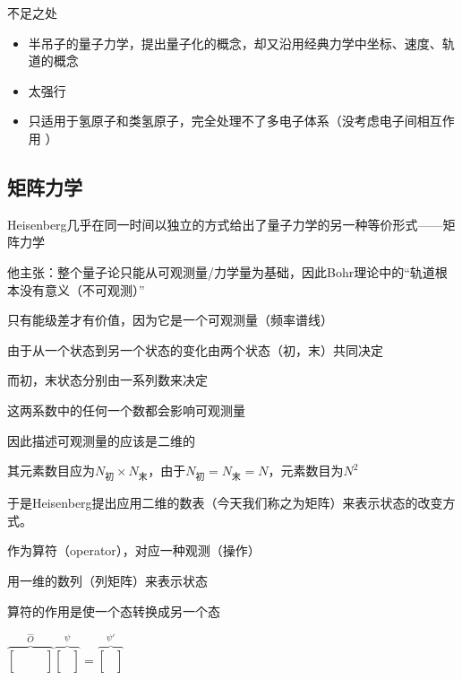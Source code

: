 \documentclass[lang=cn,10pt]{elegantbook}
\begin{document}
不足之处
\begin{itemize}
	\item 半吊子的量子力学，提出量子化的概念，却又沿用经典力学中坐标、速度、轨道的概念
	\item 太强行
	\item 只适用于氢原子和类氢原子，完全处理不了多电子体系（没考虑电子间相互作用  ）
\end{itemize}
\subsection{矩阵力学}

Heisenberg几乎在同一时间以独立的方式给出了量子力学的另一种等价形式——矩阵力学

他主张：整个量子论只能从可观测量/力学量为基础，因此Bohr理论中的“轨道根本没有意义（不可观测）”

只有能级差才有价值，因为它是一个可观测量（频率谱线）

由于从一个状态到另一个状态的变化由两个状态（初，末）共同决定

而初，末状态分别由一系列数来决定

这两系数中的任何一个数都会影响可观测量

因此描述可观测量的应该是二维的

其元素数目应为$N_{\text{初}}\times N_{\text{末}} $，由于$N_{\text{初}}= N_{\text{末}} =N$，元素数目为$N^2$

于是Heisenberg提出应用二维的数表（今天我们称之为矩阵）来表示状态的改变方式。

作为算符（operator），对应一种观测（操作）

用一维的数列（列矩阵）来表示状态

算符的作用是使一个态转换成另一个态

$\overset{\hat{O}}{\overbrace{\left[ \begin{matrix}
			&		&		\\
			&		&		\\
			&		&		\\
		\end{matrix} \right] }}\overset{\psi}{\overbrace{\left[ \begin{array}{c}
			\\
			\\
			\\
		\end{array} \right] }}=\overset{\psi'}{\overbrace{\left[ \begin{array}{c}
			\\
			\\
			\\
		\end{array} \right] }}$
	
\end{document}
